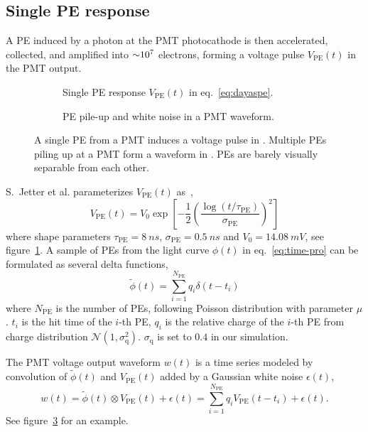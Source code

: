\subsection{Single PE response}
\label{subsec:spe}

A PE induced by a photon at the PMT photocathode is then accelerated, collected, and amplified into $\num[retain-unity-mantissa=false]{\sim 1e7}$ electrons, forming a voltage pulse $V_\mathrm{PE}(t)$ in the PMT output.
\begin{figure}[H]
  \begin{subfigure}{.49\textwidth}
    \centering
    \resizebox{\textwidth}{!}{}
    \caption{\label{fig:spe} Single PE response $V_\mathrm{PE}(t)$ in eq.~\eqref{eq:dayaspe}.}
  \end{subfigure}
  \begin{subfigure}{.49\textwidth}
    \centering
    \resizebox{\textwidth}{!}{}
    \caption{\label{fig:pile} PE pile-up and white noise in a PMT waveform.}
  \end{subfigure}
  \caption{A single PE from a PMT induces a voltage pulse in .  Multiple PEs piling up at a PMT form a waveform in .  PEs are barely visually separable from each other.}
\end{figure}

S.~Jetter et al. parameterizes $V_\mathrm{PE}(t)$ as~\cite{jetter_pmt_2012},
\begin{equation}
  V_\mathrm{PE}(t) = V_{0}\exp\left[-\frac{1}{2}\left(\frac{\log(t/\tau_\mathrm{PE})}{\sigma_\mathrm{PE}}\right)^{2}\right]
  \label{eq:dayaspe}
\end{equation}
where shape parameters $\tau_\mathrm{PE}=\SI{8}{ns}$, $\sigma_\mathrm{PE}=\SI{0.5}{ns}$ and $V_{0}=\SI{14.08}{mV}$, see figure~\ref{fig:spe}.  A sample of PEs from the light curve $\phi(t)$ in eq.~\eqref{eq:time-pro} can be formulated as several delta functions, 
\begin{equation}
  \label{eq:lc-sample}
  \tilde{\phi}(t) = \sum_{i=1}^{N_{\mathrm{PE}}} q_i \delta(t-t_i)
\end{equation}
where $N_\mathrm{PE}$ is the number of PEs, following Poisson distribution with parameter $\mu$.  $t_i$ is the hit time of the $i$-th PE, $q_i$ is the relative charge of the $i$-th PE from charge distribution $\mathcal{N}(1,\sigma_\mathrm{q}^2)$.  $\sigma_\mathrm{q}$ is set to $0.4$ in our simulation.

The PMT voltage output waveform $w(t)$ is a time series modeled by convolution of $\tilde{\phi}(t)$ and $V_\mathrm{PE}(t)$ added by a Gaussian white noise $\epsilon(t)$,
\begin{equation}
  \label{eq:1}
  w(t) = \tilde{\phi}(t) \otimes V_\mathrm{PE}(t) + \epsilon(t) = \sum_{i=1}^{N_\mathrm{PE}} q_i V_\mathrm{PE}(t-t_i) + \epsilon(t).
\end{equation}
See figure~\ref{fig:pile} for an example.


